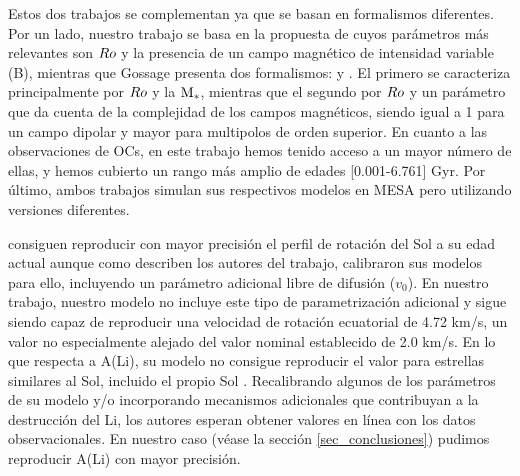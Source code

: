 Estos dos trabajos se complementan ya que se basan en formalismos diferentes. Por un lado, nuestro trabajo se basa en la propuesta de \cite{Gallet2013} cuyos parámetros más relevantes son $Ro$ y la presencia de un campo magnético de intensidad variable (B), mientras que Gossage presenta dos formalismos: \cite{Matt2015} y \cite{Garraffo2018}. El primero se caracteriza principalmente por $Ro$ y la $\mathrm{M}_*$, mientras que el segundo por $Ro$ y un parámetro que da cuenta de la complejidad de los campos magnéticos, siendo igual a 1 para un campo dipolar y mayor para multipolos de orden superior. En cuanto a las observaciones de OCs, en este trabajo hemos tenido acceso a un mayor número de ellas, y hemos cubierto un rango más amplio de edades [0.001-6.761] Gyr. Por último, ambos trabajos simulan sus respectivos modelos en MESA pero utilizando versiones diferentes.\par

\cite{Gossage2021} consiguen reproducir con mayor precisión el perfil de rotación del Sol a su edad actual \cite[ver][panel (a) de las Figuras 2, 4 \& 6]{Gossage2021} aunque como describen los autores del trabajo, calibraron sus modelos para ello, incluyendo un parámetro adicional libre de difusión ($v_0$). En nuestro trabajo, nuestro modelo no incluye este tipo de parametrización adicional y sigue siendo capaz de reproducir una velocidad de rotación ecuatorial de 4.72 km/s, un valor no especialmente alejado del valor nominal establecido de 2.0 km/s. En lo que respecta a A(Li), su modelo no consigue reproducir el valor para estrellas similares al Sol, incluido el propio Sol \cite[ver][panel (d) en las Figuras 2 \& 4, y (b) en la Figura 6]{Gossage2021}. Recalibrando algunos de los parámetros de su modelo y/o incorporando mecanismos adicionales que contribuyan a la destrucción del Li, los autores esperan obtener valores en línea con los datos observacionales. En nuestro caso (véase la sección \ref{sec_conclusiones}) pudimos reproducir A(Li) con mayor precisión.

